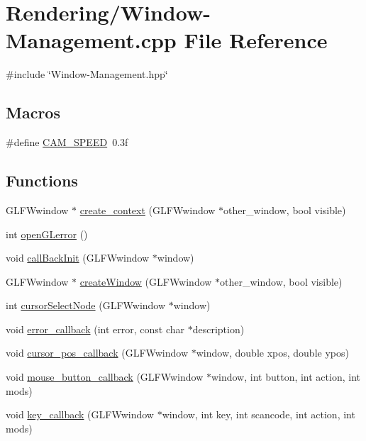 \hypertarget{Window-Management_8cpp}{}\section{Rendering/\+Window-\/\+Management.cpp File Reference}
\label{Window-Management_8cpp}
{\ttfamily \#include \char`\"{}Window-\/\+Management.\+hpp\char`\"{}}\newline
\subsection*{Macros}
\begin{DoxyCompactItemize}
\item 
\#define \mbox{\hyperlink{Window-Management_8cpp_ab91512fde255a648fe16920b3d94911b}{C\+A\+M\+\_\+\+S\+P\+E\+ED}}~0.\+3f
\end{DoxyCompactItemize}
\subsection*{Functions}
\begin{DoxyCompactItemize}
\item 
G\+L\+F\+Wwindow $\ast$ \mbox{\hyperlink{Window-Management_8cpp_a9397388c884393663c7db62632ce7e3b}{create\+\_\+context}} (G\+L\+F\+Wwindow $\ast$other\+\_\+window, bool visible)
\item 
int \mbox{\hyperlink{Window-Management_8cpp_a2008ec7e2e49a51a3d3f0091cf96bc55}{open\+G\+Lerror}} ()
\item 
void \mbox{\hyperlink{Window-Management_8cpp_a49a5ff4f2fc2d79e62443424b32433ec}{call\+Back\+Init}} (G\+L\+F\+Wwindow $\ast$window)
\item 
G\+L\+F\+Wwindow $\ast$ \mbox{\hyperlink{Window-Management_8cpp_a9339e5430780aba11944a8d27061c58c}{create\+Window}} (G\+L\+F\+Wwindow $\ast$other\+\_\+window, bool visible)
\item 
int \mbox{\hyperlink{Window-Management_8cpp_ad5b164b37db3d203f662106c1d5b7fee}{cursor\+Select\+Node}} (G\+L\+F\+Wwindow $\ast$window)
\item 
void \mbox{\hyperlink{Window-Management_8cpp_a4ee391c8bab624943c822faafb2c320e}{error\+\_\+callback}} (int error, const char $\ast$description)
\item 
void \mbox{\hyperlink{Window-Management_8cpp_ab9a970cff09c5a4031b814242706b4f6}{cursor\+\_\+pos\+\_\+callback}} (G\+L\+F\+Wwindow $\ast$window, double xpos, double ypos)
\item 
void \mbox{\hyperlink{Window-Management_8cpp_a5515d805e76ce6728de3c0dc5e187c86}{mouse\+\_\+button\+\_\+callback}} (G\+L\+F\+Wwindow $\ast$window, int button, int action, int mods)
\item 
void \mbox{\hyperlink{Window-Management_8cpp_a286930f4e8ede059b83ff6eafa2ff718}{key\+\_\+callback}} (G\+L\+F\+Wwindow $\ast$window, int key, int scancode, int action, int mods)
\end{DoxyCompactItemize}


